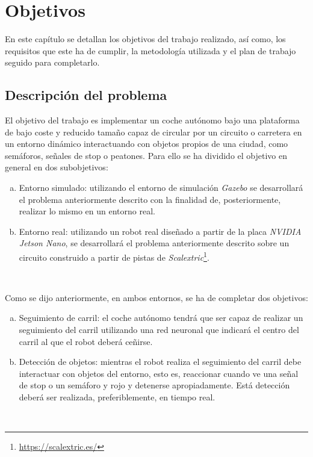 \chapter{Objetivos}
\label{cap:capitulo2}

En este capítulo se detallan los objetivos del trabajo realizado, así como, los requisitos que este ha de cumplir, la metodología utilizada y el plan de trabajo seguido para completarlo.\\

\section{Descripción del problema}
\label{sec:descripcion}

El objetivo del trabajo es implementar un coche autónomo bajo una plataforma de bajo coste y reducido tamaño capaz de circular por un circuito o carretera en un entorno dinámico interactuando con objetos propios de una ciudad, como semáforos, señales de stop o peatones. Para ello se ha dividido el objetivo en general en dos subobjetivos:

\begin{enumerate}[(a)]
	\item Entorno simulado: utilizando el entorno de simulación \textit{Gazebo} se desarrollará el problema anteriormente descrito con la finalidad de, posteriormente, realizar lo mismo en un entorno real.\\
	\item Entorno real: utilizando un robot real diseñado a partir de la placa \textit{NVIDIA Jetson Nano}, se desarrollará el problema anteriormente descrito sobre un circuito construido a partir de pistas de \textit{Scalextric}\footnote{\url{https://scalextric.es/}}.\\
\end{enumerate}\

Como se dijo anteriormente, en ambos entornos, se ha de completar dos objetivos:

\begin{enumerate}[(a)]
	\item Seguimiento de carril: el coche autónomo tendrá que ser capaz de realizar un seguimiento del carril utilizando una red neuronal que indicará el centro del carril al que el robot deberá ceñirse.
	\item Detección de objetos: mientras el robot realiza el seguimiento del carril debe interactuar con objetos del entorno, esto es, reaccionar cuando ve una señal de stop o un semáforo y rojo y detenerse apropiadamente. Está detección deberá ser realizada, preferiblemente, en tiempo real.
\end{enumerate}\

